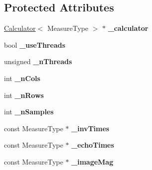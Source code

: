 \subsection*{Protected Attributes}
\begin{DoxyCompactItemize}
\item 
\hyperlink{class_ox_1_1_calculator}{Calculator}$<$ Measure\+Type $>$ $\ast$ {\bfseries \+\_\+calculator}\hypertarget{class_ox_1_1_image_calculator_a199694ac36be57ef82e4eab89de54f88}{}\label{class_ox_1_1_image_calculator_a199694ac36be57ef82e4eab89de54f88}

\item 
bool {\bfseries \+\_\+use\+Threads}\hypertarget{class_ox_1_1_image_calculator_a00706fee617f4cdc79a9fe73d6eb7952}{}\label{class_ox_1_1_image_calculator_a00706fee617f4cdc79a9fe73d6eb7952}

\item 
unsigned {\bfseries \+\_\+n\+Threads}\hypertarget{class_ox_1_1_image_calculator_a4507e3029457037348907d768e237ad9}{}\label{class_ox_1_1_image_calculator_a4507e3029457037348907d768e237ad9}

\item 
int {\bfseries \+\_\+n\+Cols}\hypertarget{class_ox_1_1_image_calculator_ad0907927d45dead403a6498832ecb049}{}\label{class_ox_1_1_image_calculator_ad0907927d45dead403a6498832ecb049}

\item 
int {\bfseries \+\_\+n\+Rows}\hypertarget{class_ox_1_1_image_calculator_ac2319d55027586587dcce5037bbea335}{}\label{class_ox_1_1_image_calculator_ac2319d55027586587dcce5037bbea335}

\item 
int {\bfseries \+\_\+n\+Samples}\hypertarget{class_ox_1_1_image_calculator_ae9cec673a9a41d5815ab6896e4aab667}{}\label{class_ox_1_1_image_calculator_ae9cec673a9a41d5815ab6896e4aab667}

\item 
const Measure\+Type $\ast$ {\bfseries \+\_\+inv\+Times}\hypertarget{class_ox_1_1_image_calculator_ae7e7bc1a2e1d65ced24bea92eb3965b4}{}\label{class_ox_1_1_image_calculator_ae7e7bc1a2e1d65ced24bea92eb3965b4}

\item 
const Measure\+Type $\ast$ {\bfseries \+\_\+echo\+Times}\hypertarget{class_ox_1_1_image_calculator_acf495e7f23eff85e1c817598b6ebe942}{}\label{class_ox_1_1_image_calculator_acf495e7f23eff85e1c817598b6ebe942}

\item 
const Measure\+Type $\ast$ {\bfseries \+\_\+image\+Mag}\hypertarget{class_ox_1_1_image_calculator_a6f9a046052a6a349e7e2ed339ad5d05a}{}\label{class_ox_1_1_image_calculator_a6f9a046052a6a349e7e2ed339ad5d05a}


\end{DoxyCompactItemize}
